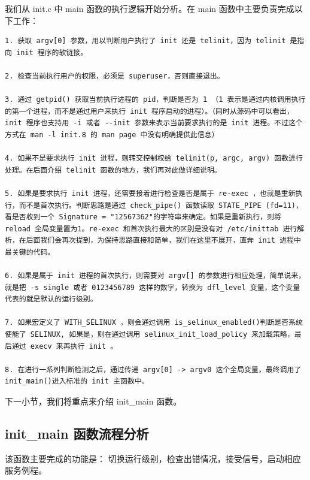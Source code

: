 我们从 init.c 中 main 函数的执行逻辑开始分析。在 main
函数中主要负责完成以下工作：

{\begin{shaded}\begin{verbatim}
1. 获取 argv[0] 参数，用以判断用户执行了 init 还是 telinit，因为 telinit 是指向 init 程序的软链接。

2. 检查当前执行用户的权限，必须是 superuser，否则直接退出。

3. 通过 getpid() 获取当前执行进程的 pid，判断是否为 1 （1 表示是通过内核调用执行的第一个进程，而不是通过用户来执行 init 程序启动的进程）。（同时从源码中可以看出，init 程序也支持用 -i 或者 --init 参数来表示当前要求执行的是 init 进程。不过这个方式在 man -l init.8 的 man page 中没有明确提供此信息）

4. 如果不是要求执行 init 进程，则转交控制权给 telinit(p, argc, argv) 函数进行处理。在后面介绍 telinit 函数的地方，我们再对此做详细说明。

5. 如果是要求执行 init 进程，还需要接着进行检查是否是属于 re-exec ，也就是重新执行，而不是首次执行。判断思路是通过 check_pipe() 函数读取 STATE_PIPE (fd=11)，看是否收到一个 Signature = "12567362"的字符串来确定。如果是重新执行，则将 reload 全局变量置为1。re-exec 和首次执行最大的区别是没有对 /etc/inittab 进行解析，在后面我们会再次提到，为保持思路直接和简单，我们在这里不展开，直奔 init 进程中最关键的代码。

6. 如果是属于 init 进程的首次执行，则需要对 argv[] 的参数进行相应处理，简单说来，就是把 -s single 或者 0123456789 这样的数字，转换为 dfl_level 变量，这个变量代表的就是默认的运行级别。

7. 如果宏定义了 WITH_SELINUX ，则会通过调用 is_selinux_enabled()判断是否系统使能了 SELINUX, 如果是，则在通过调用 selinux_init_load_policy 来加载策略，最后通过 execv 来再执行 init 。

8. 在进行一系列判断检测之后，通过传递 argv[0] -> argv0 这个全局变量，最终调用了 init_main()进入标准的 init 主函数中。
\end{verbatim}\end{shaded}}
下一小节，我们将重点来介绍 init\_main 函数。

\subsection{init\_main 函数流程分析}

该函数主要完成的功能是：
切换运行级别，检查出错情况，接受信号，启动相应服务例程。

